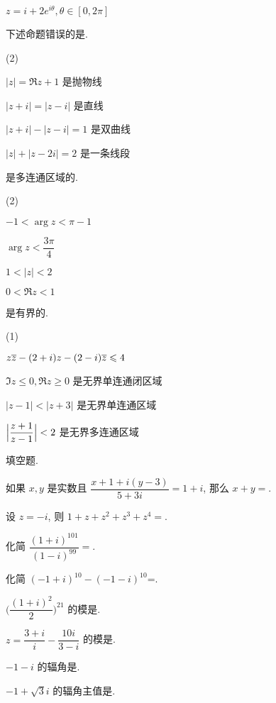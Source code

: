 \begin{homework}
\begin{exlist}
\begin{taskschoice}
      \item $z=i+2e^{i\theta},\theta\in[0,2\pi]$
    \end{taskschoice}
    \item 下述命题错误的是\fillbrace{}.
    \begin{taskschoice}(2)
      \item $|z|=\Re z+1$ 是抛物线
      \item $|z+i|=|z-i|$ 是直线
      \item $|z+i|-|z-i|=1$ 是双曲线
      \item $|z|+|z-2i|=2$ 是一条线段
    \end{taskschoice}
    \item \fillbrace{}是多连通区域的.
    \begin{taskschoice}(2)
      \item $-1<\arg z<\pi-1$
      \item $\arg z<\dfrac{3\pi}4$
      \item $1<|z|<2$
      \item $0<\Re z<1$
    \end{taskschoice}
    \item \fillbrace{}是有界的.
    \begin{taskschoice}(1)
      \item $z\overline z-(2+i)z-(2-i)\overline z\leqslant 4$
      \item $\Im z\le0,\Re z\ge0$ 是无界单连通闭区域
      \item $|z-1|<|z+3|$ 是无界单连通区域
      \item $\Bigl|\dfrac{z+1}{z-1}\Bigr|<2$ 是无界多连通区域
    \end{taskschoice}
  \end{exlist}
  \item 填空题.
  \begin{exlist}
    \item 如果 $x,y$ 是实数且 $\dfrac{x+1+i(y-3)}{5+3i}=1+i$, 那么 $x+y=$\fillblank{}.
    \item 设 $z=-i$, 则 $1+z+z^2+z^3+z^4=$\fillblank{}.
    \item 化简 $\dfrac{(1+i)^{101}}{(1-i)^{99}}=$\fillblank{}.
    \item 化简 $(-1+i)^{10}-(-1-i)^{10}$=\fillblank{}.
    \item $\biggl(\dfrac{(1+i)^2}2\biggr)^{21}$ 的模是\fillblank{}.
    \item $z=\dfrac{3+i}{i}-\dfrac{10i}{3-i}$ 的模是\fillblank{}.
    \item $-1-i$ 的辐角是\fillblank{}.
    \item $-1+\sqrt 3i$ 的辐角主值是\fillblank{}.

\end{exlist}
\end{homework}
